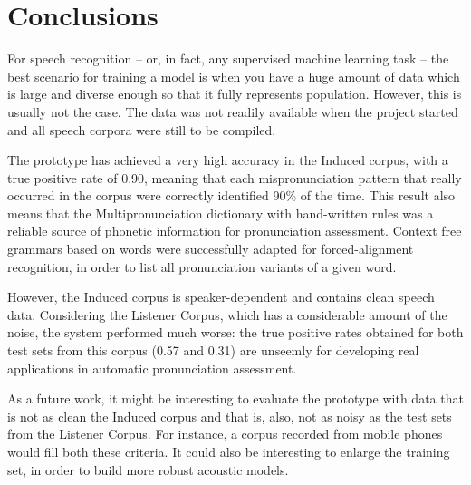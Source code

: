 \documentclass[twocolumn]{bmcart}%
\begin{document}
\section{Conclusions}\label{conclusion}

For speech recognition -- or, in fact, any supervised  machine learning task -- the best
scenario for training a model is when you have a huge amount of data which is large and
diverse enough so that it fully represents population. However, this is usually not the case. 
The data was not readily available when the project started and all speech corpora were still to be compiled. 

The prototype has achieved a very high accuracy in the Induced corpus, with a true positive rate of 0.90, meaning that each mispronunciation pattern that really occurred in the corpus were correctly identified 90\% of the time. This result also means that the Multipronunciation dictionary with hand-written rules was a reliable source of phonetic information for pronunciation assessment. Context free grammars based on words were successfully adapted for forced-alignment recognition, in order to list all pronunciation variants of a given word.

However, the Induced corpus is speaker-dependent and contains clean speech data. Considering the Listener Corpus, which has a considerable amount of the noise, the system performed much worse: the true positive rates obtained for both test sets from this corpus (0.57 and 0.31) are unseemly for developing real applications in automatic pronunciation assessment. 

As a future work, it might be interesting to evaluate the prototype with data that is not as clean the Induced corpus and that is, also, not as noisy as the test sets from the Listener Corpus. For instance, a corpus recorded from mobile phones would fill both these criteria. It could also be interesting to enlarge the training set, in order to build more robust acoustic models.

\end{document}
